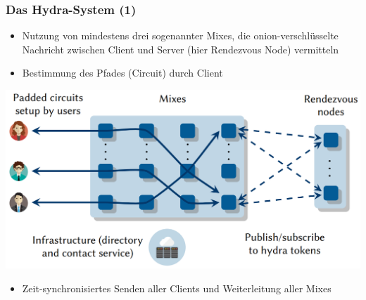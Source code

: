 \documentclass[t]{beamer}
\begin{document}
    \begin{frame}
        \frametitle{Das Hydra-System (1)}
        \pause

        \begin{itemize}
            \item
                Nutzung von mindestens drei sogenannter \glqq Mixes\grqq, die onion-verschlüsselte Nachricht
                zwischen Client und Server (hier \glqq Rendezvous Node\grqq) vermitteln
                \pause

            \item
                Bestimmung des Pfades (\glqq Circuit\grqq) durch Client
                \pause
        \end{itemize}

        \centering\includegraphics[scale=0.25]{hydra_design.png}
        \pause

        \begin{itemize}
            \item
                Zeit-synchronisiertes Senden aller Clients und Weiterleitung aller Mixes
        \end{itemize}
    \end{frame}
\end{document}
